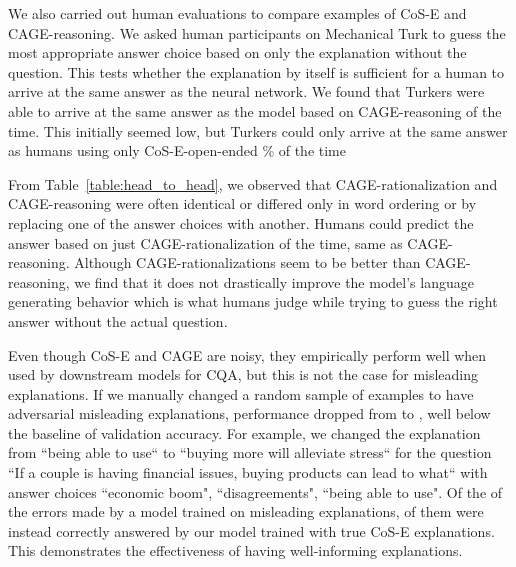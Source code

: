 \documentclass[11pt,a4paper]{article}
\begin{document}
We also carried out human evaluations to compare  examples of CoS-E and CAGE-reasoning. 
We asked human participants on Mechanical Turk to guess the most appropriate answer choice based on only the explanation without the question. 
This tests whether the explanation by itself is sufficient for a human to arrive at the same answer as the neural network. 
We found that Turkers were able to arrive at the same answer as the model based on CAGE-reasoning  of the time.
This initially seemed low, but Turkers could only arrive at the same answer as humans using only CoS-E-open-ended \% of the time

From Table~\ref{table:head_to_head}, we observed that CAGE-rationalization and CAGE-reasoning were often identical or differed only in word ordering or by replacing one of the answer choices with another.
Humans could predict the answer based on just CAGE-rationalization  of the time, same as CAGE-reasoning. 
Although CAGE-rationalizations seem to be better than CAGE-reasoning, we
find that it does not drastically improve the model's
language generating behavior which is what humans
judge while trying to guess the right answer
without the actual question.

Even though CoS-E and CAGE are noisy, they empirically perform well when used by downstream models for CQA, but this is not the case for misleading explanations.
If we manually changed a random sample of  examples to have adversarial misleading explanations, performance dropped from  to , well below the baseline of  validation accuracy.
For example, we changed the explanation from ``being able to use`` to ``buying more will alleviate stress`` for the question ``If a couple is having financial issues, buying products can lead to what`` with answer choices ``economic boom", ``disagreements", ``being able to use".
Of the  of the errors made by a model trained on misleading explanations,  of them were instead correctly answered by our model trained with true CoS-E explanations.
This demonstrates the effectiveness of having well-informing explanations.
\end{document}
